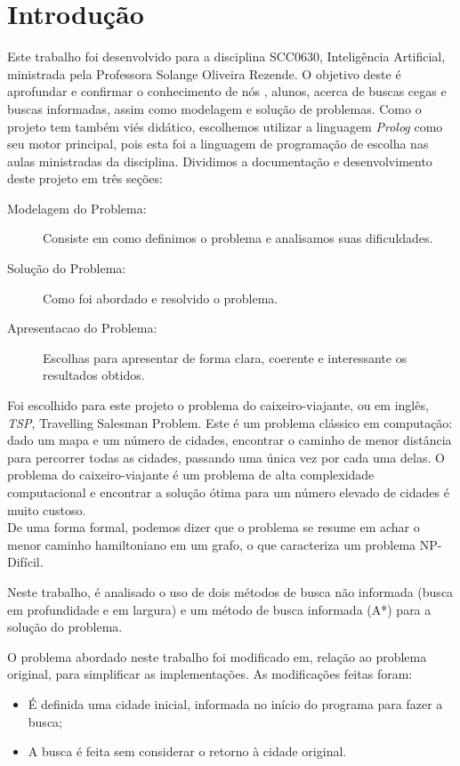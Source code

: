 \documentclass[12pt,a4paper]{article}
\begin{document}
\section{Introdução}
Este trabalho foi desenvolvido para a disciplina SCC0630, Inteligência Artificial, ministrada pela Professora Solange Oliveira Rezende. O objetivo deste é aprofundar e confirmar o conhecimento de nós , alunos, acerca de buscas cegas e buscas informadas, assim como modelagem e solução de problemas. Como o projeto tem também viés didático, escolhemos utilizar a linguagem \emph{Prolog} como seu motor principal, pois esta foi a linguagem de programação de escolha nas aulas ministradas da disciplina. Dividimos a documentação e desenvolvimento deste projeto em três seções:
\begin{description}
  \item [Modelagem do Problema:]

Consiste em como definimos o problema e analisamos suas dificuldades.
\item [Solução do Problema:]

Como  foi abordado e resolvido o problema.
\item[Apresentacao do Problema:]

Escolhas para apresentar de forma clara, coerente e interessante os resultados obtidos.  
\end{description}

Foi escolhido para este projeto o problema do caixeiro-viajante, ou em inglês, \emph{TSP}, Travelling Salesman Problem.
Este é um problema clássico em computação: dado um mapa e um número de cidades, encontrar o caminho de menor distância para percorrer todas as cidades,
passando uma única vez por cada uma delas. O problema do caixeiro-viajante é um problema de alta complexidade computacional e encontrar a solução ótima para um número elevado de cidades é muito custoso.\\
De uma forma formal, podemos dizer que o problema se resume em achar o menor caminho hamiltoniano em um grafo, o que caracteriza um problema NP-Difícil.

Neste trabalho, é analisado o uso de dois métodos de busca não informada (busca em profundidade e em largura) e um método de busca informada (A*) para a solução do problema.

O problema abordado neste trabalho foi modificado em, relação ao problema original, para simplificar as implementações. As modificações feitas foram:
\begin{itemize}
  \item 

É definida uma cidade inicial, informada no início do programa para fazer a busca;
\item A busca é feita sem considerar o retorno à cidade original.
\end{itemize}
\end{document}
